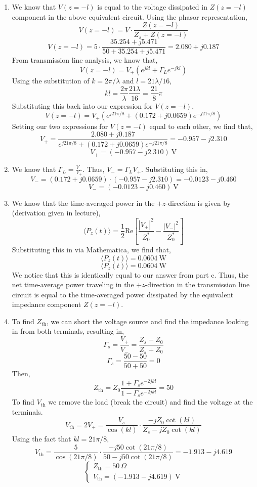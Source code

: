\documentclass[12pt]{article}
\begin{document}
\begin{enumerate}
\begin{enumerate}
		\item [(d)]
		We know that $V(z=-l)$ is equal to the voltage dissipated in $Z(z=-l)$ component in the above equivalent circuit.
		Using the phasor representation,
		\[V(z=-l)=V\cdot \frac{Z(z=-l)}{Z_s+Z(z=-l)}\]
		\[V(z=-l)=5\cdot \frac{35.254+j5.471}{50+35.254+j5.471}=2.080 + j0.187\]
		From transmission line analysis, we know that,
		\[V(z=-l)=V_+\left(e^{jkl}+\Gamma_Le^{-jkl}\right)\]
		Using the substitution of $k=2\pi/\lambda$ and $l=21\lambda/16$,
		\[kl = \frac{2\pi}{\lambda}\frac{21\lambda}{16}=\frac{21}{8}\pi\]
		Substituting this back into our expression for $V(z=-l)$,
		\[V(z=-l)=V_+\left(e^{j21\pi/8}+(0.172+j0.0659)e^{-j21\pi/8}\right)\]
		Setting our two expressions for $V(z=-l)$ equal to each other, we find that,
		\[V_+=\frac{2.080 + j0.187}{e^{j21\pi/8}+(0.172+j0.0659)e^{-j21\pi/8}}=-0.957-j2.310\]
		\[\boxed{V_+=\left(-0.957-j2.310\right)\: \mathrm{V}}\]

		\item [(e)]
		We know that $\Gamma_L=\frac{V_-}{V_+}$.
		Thus, $V_-=\Gamma_LV_+$.
		Substituting this in,
		\[V_-=(0.172+j0.0659)\cdot(-0.957-j2.310)=-0.0123-j0.460\]
		\[\boxed{V_-=\left(-0.0123-j0.460\right)\: \mathrm{V}}\]

		\item [(f)]
		We know that the time-averaged power in the $+z$-direction is given by (derivation given in lecture),
		\[\langle P_z(t)\rangle = \frac{1}{2}\mathrm{Re}\left[\frac{|V_+|^2}{Z_0^*}-\frac{|V_-|^2}{Z_0^*}\right]\]
		Substituting this in via Mathematica, we find that,
		\[\langle P_z(t)\rangle = 0.0604\:\mathrm{W}\]
		\[\boxed{\langle P_z(t)\rangle = 0.0604\:\mathrm{W}}\]
		We notice that this is identically equal to our answer from part c.
		Thus, the net time-average power traveling in the $+z$-direction in the transmission line circuit is equal to the time-averaged power dissipated by the equivalent impedance component $Z(z=-l)$.

		\item [(g)]
		To find $Z_{\mathrm{th}}$, we can short the voltage source and find the impedance looking in from both terminals, resulting in,
		\[\Gamma_s=\frac{V_+}{V_-}=\frac{Z_s-Z_0}{Z_s+Z_0}\]
		\[\Gamma_s=\frac{50-50}{50+50}=0\]
		Then,
		\[Z_{\mathrm{th}}=Z_0\frac{1+\Gamma_se^{-2jkl}}{1-\Gamma_se^{-2jkl}}=50\]
		To find $V_{\mathrm{th}}$ we remove the load (break the circuit) and find the voltage at the terminals.
		\[V_{\mathrm{th}}=2V_+=\frac{V_s}{\cos(kl)}\cdot\frac{-jZ_0\cot(kl)}{Z_s-jZ_0\cot(kl)}\]
		Using the fact that $kl=21\pi/8$,
		\[V_{\mathrm{th}}=\frac{5}{\cos(21\pi/8)}\cdot \frac{-j50\cot(21\pi/8)}{50-j50\cot(21\pi/8)}=-1.913-j4.619\]
		\[\boxed{\begin{cases}
			Z_{\mathrm{th}} = 50 \: \Omega \\ 
			V_{\mathrm{th}} = (-1.913-j4.619) \: \mathrm{V}
		\end{cases}}\]


\end{enumerate}
\end{enumerate}
\end{document}
